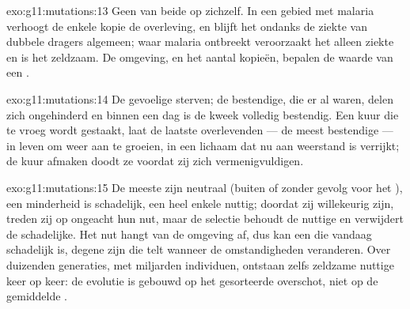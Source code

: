 \begin{solution}{exo:g11:mutations:13}
Geen van beide op zichzelf. In een gebied met malaria verhoogt de enkele
kopie de overleving, en blijft het  ondanks de ziekte van dubbele
dragers algemeen; waar malaria ontbreekt veroorzaakt het alleen ziekte en
is het zeldzaam. De omgeving, en het aantal kopieën, bepalen de waarde
van een .
\end{solution}

\begin{solution}{exo:g11:mutations:14}
De gevoelige  sterven; de bestendige, die er al waren, delen zich
ongehinderd en binnen een dag is de kweek volledig bestendig. Een kuur
die te vroeg wordt gestaakt, laat de laatste overlevenden --- de meest
bestendige --- in leven om weer aan te groeien, in een lichaam dat nu aan
weerstand is verrijkt; de kuur afmaken doodt ze voordat zij zich
vermenigvuldigen.
\end{solution}

\begin{solution}{exo:g11:mutations:15}
De meeste  zijn neutraal (buiten  of zonder gevolg voor het
), een minderheid is schadelijk, een heel enkele nuttig; doordat zij
willekeurig zijn, treden zij op ongeacht hun nut, maar de selectie
behoudt de nuttige en verwijdert de schadelijke. Het nut hangt van de
omgeving af, dus kan een  die vandaag schadelijk is, degene zijn
die telt wanneer de omstandigheden veranderen. Over duizenden generaties,
met miljarden individuen, ontstaan zelfs zeldzame nuttige  keer
op keer: de evolutie is gebouwd op het gesorteerde overschot, niet op de
gemiddelde .
\end{solution}

